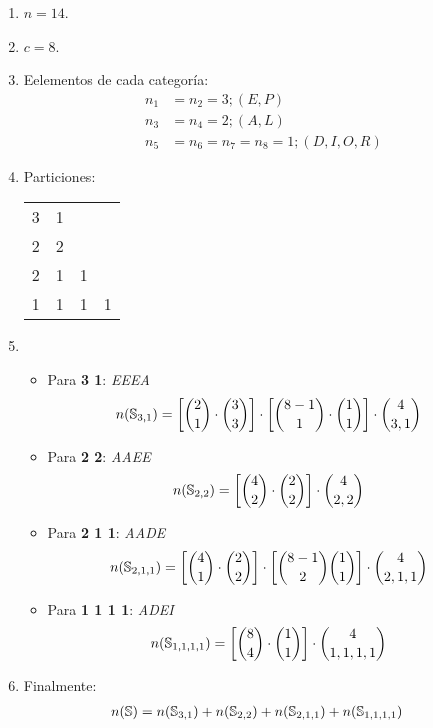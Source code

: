 \begin{enumerate}
\item $n=14$.
\item $c=8$.
\item Eelementos de cada categoría: \begin{align*}
n_1&=n_2=3; (E, P)\\
n_3&=n_4=2; (A, L)\\
n_5&=n_6=n_7=n_8=1; (D, I, O,R)
\end{align*}
\item Particiones:
\begin{table}[!ht]
\centering
\begin{tabular}{c c c c }
3 & 1\\
2 & 2\\
2 & 1 & 1\\
1 & 1 & 1 & 1
\end{tabular}
\end{table}
\item 
\begin{itemize}
\item Para \textbf{3 1}:
\textit{EEEA}
\begin{align*}
n(\mathbb{S}_{3,1})&=\left[\binom{2}{1}\cdot\binom{3}{3}\right]\cdot\left[\binom{8-1}{1}\cdot\binom{1}{1}\right]\cdot\binom{4}{3,1}
\end{align*}

\item Para \textbf{2 2}:
\textit{AAEE}
\begin{align*}
n(\mathbb{S}_{2,2})&=\left[\binom{4}{2}\cdot\binom{2}{2}\right]\cdot\binom{4}{2,2}
\end{align*}
\item Para \textbf{2 1 1}:
\textit{AADE}
\begin{align*}
n(\mathbb{S}_{2,1,1})&=\left[\binom{4}{1}\cdot\binom{2}{2}\right]\cdot\left[\binom{8-1}{2}\binom{1}{1}\right]\cdot\binom{4}{2,1,1}
\end{align*}
\item Para \textbf{1 1 1 1}:
\textit{ADEI}
\begin{align*}
n(\mathbb{S}_{1,1,1,1})&=\left[\binom{8}{4}\cdot\binom{1}{1}\right]\cdot\binom{4}{1,1,1,1}
\end{align*}
\end{itemize}
\item Finalmente:
\begin{align*}
n(\mathbb{S})&=n(\mathbb{S}_{3,1})+n(\mathbb{S}_{2,2})+n(\mathbb{S}_{2,1,1})+n(\mathbb{S}_{1,1,1,1})
\end{align*}
\end{enumerate}

